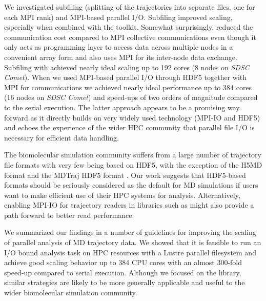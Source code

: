 We investigated subfiling (splitting of the trajectories into separate files, one for each MPI rank) and MPI-based parallel I/O.
Subfiling improved scaling, especially when combined with the  toolkit.
Somewhat surprisingly,  reduced the communication cost compared to MPI collective communications even though it only acts as programming layer to access data across multiple nodes in a convenient array form and also uses MPI for its inter-node data exchange.
Subfiling with  achieved nearly ideal scaling up to 192 cores (8 nodes on \emph{SDSC Comet}).
When we used MPI-based parallel I/O through HDF5 together with MPI for communications we achieved nearly ideal performance up to 384 cores (16 nodes on \emph{SDSC Comet}) and speed-ups of two orders of magnitude compared to the serial execution.
The latter approach appears to be a promising way forward as it directly builds on very widely used technology (MPI-IO and HDF5) and echoes the experience of the wider HPC community that parallel file I/O is necessary for efficient data handling.

The biomolecular simulation community suffers from a large number of trajectory file formats with very few being based on HDF5, with the exception of the H5MD format \cite{Buyl:2014aa} and the MDTraj HDF5 format \cite{McGibbon:2015aa}.
Our work suggests that HDF5-based formats should be seriously considered as the default for MD simulations if users want to make efficient use of their HPC systems for analysis. 
Alternatively, enabling MPI-IO for trajectory readers in libraries such as  might also provide a path forward to better read performance.

We summarized our findings in a number of guidelines for improving the scaling of parallel analysis of MD trajectory data.
We showed that it is feasible to run an I/O bound analysis task on HPC resources with a Lustre parallel filesystem and achieve good scaling behavior up to 384 CPU cores with an almost 300-fold speed-up compared to serial execution.
Although we focused on the  library, similar strategies are likely to be more generally applicable and useful to the wider biomolecular simulation community.



